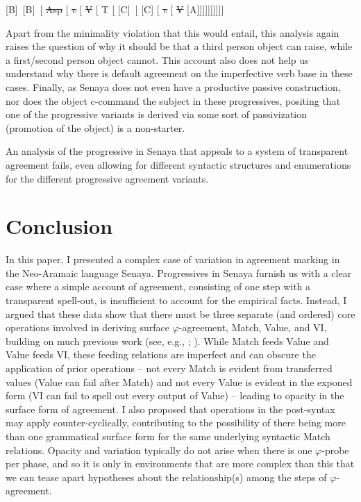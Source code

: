 \documentclass[output=paper
,modfonts
,nonflat]{langsci/langscibook}
\begin{document}
	\begin{exe}
		\ex \label{SDOtrans}\relax
		[ \ConnectTail{OB}[A][B]\relax\ [B]\relax\ [ \sout{Asp} [ \sout{\textit{v}} [ \sout{V} [ T [ [C]\relax\ [ [C] [ \sout{\textit{v}} [ \sout{V} [A]\relax ]]]]]]]]]
	\end{exe}

\noindent Apart from the minimality violation that this would entail, this analysis again raises the question of why it should be that a third person object can raise, while a first/second person object cannot. This account also does not help us understand why there is default agreement on the imperfective verb base in these cases. Finally, as Senaya does not even have a productive passive construction, nor does the object c-command the subject in these progressives, positing that one of the progressive variants is derived via some sort of passivization (promotion of the object) is a non-starter.

An analysis of the progressive in Senaya that appeals to a system of transparent agreement fails, even allowing for different syntactic structures and enumerations for the different progressive agreement variants.

\section{Conclusion} \label{sec-kalin:6}

In this paper, I presented a complex case of variation in agreement marking in the Neo-Aramaic language Senaya. Progressives in Senaya furnish us with a clear case where a simple account of agreement, consisting of one step with a transparent spell-out, is insufficient to account for the empirical facts. Instead, I argued that these data show that there must be three separate (and ordered) core operations involved in deriving surface $\varphi$-agreement, Match, Value, and VI, building on much previous work (see, e.g., \citealt{vanKoppen07,BBP09,ArregiNevins12,BhattWalkow13,Bonet13,Marusicetal15, Smith17, AtlamazBakerTA}; ). While Match feeds Value and Value feeds VI, these feeding relations are imperfect and can obscure the application of prior operations -- not every Match is evident from transferred values (Value can fail after Match) and not every Value is evident in the exponed form (VI can fail to spell out every output of Value) -- leading to opacity in the surface form of agreement. I also proposed that operations in the post-syntax may apply counter-cyclically, contributing to the possibility of there being more than one grammatical surface form for the same underlying syntactic Match relations. Opacity and variation typically do not arise when there is one $\varphi$-probe per phase, and so it is only in environments that are more complex than this that we can tease apart hypotheses about the relationship(s) among the steps of $\varphi$-agreement.
\end{document}
